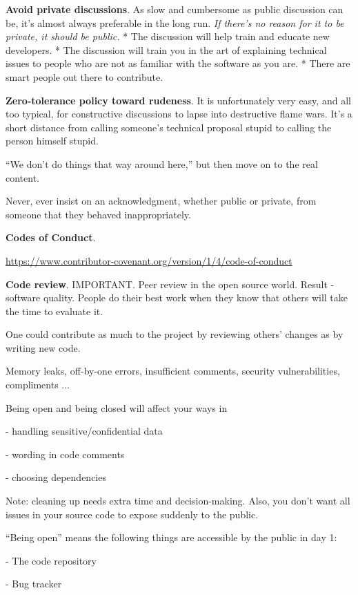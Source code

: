\documentclass[landscape,30pt]{foils}
\begin{document}
{\bf Avoid private discussions}. As slow and cumbersome as public discussion can be, it's almost always preferable in the long run. {\em If there's no reason for it to be private, it should be public.}  * The discussion will help train and educate new developers.   *  The discussion will train you in the art of explaining technical issues to people who are not as familiar with the software as you are.   * There are smart people out there to contribute.

{\bf Zero-tolerance policy toward rudeness}.  It is unfortunately very
easy, and all too typical, for constructive discussions to lapse into
destructive flame wars.  It's a short distance from calling someone's
technical proposal stupid to calling the person himself stupid.

``We don't do things that way around here,'' but then move on to the
real content.

Never, ever insist on an acknowledgment, whether public
or private, from someone that they behaved inappropriately.

{\bf Codes of Conduct}.

\url{https://www.contributor-covenant.org/version/1/4/code-of-conduct}

{\bf Code review}.  IMPORTANT.  Peer review in the open source world.
Result - software quality.  People do their best work when they know
that others will take the time to evaluate it.

One could contribute as much to the project by reviewing others'
changes as by writing new code.

Memory leaks, off-by-one errors, insufficient comments, security vulnerabilities, compliments ...


Being open and being closed will affect your ways in

- handling sensitive/confidential data

- wording in code comments

- choosing dependencies 

Note: cleaning up needs extra time and decision-making.  Also, you don't want all issues in your source code to expose suddenly to the public.

``Being open'' means the following things are accessible by the public in day 1:

- The code repository

- Bug tracker
\end{document}
